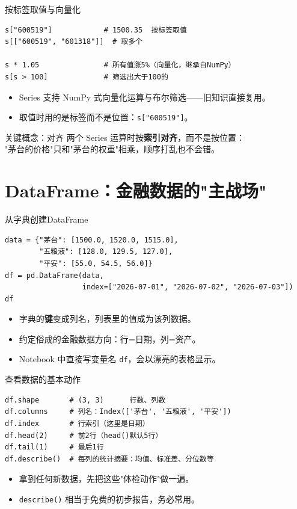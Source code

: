 \documentclass[9pt]{ctexbeamer}
\begin{document}
\begin{frame}[fragile]{按标签取值与向量化}
	\begin{lstlisting}
s["600519"]            # 1500.35  按标签取值
s[["600519", "601318"]]  # 取多个

s * 1.05               # 所有值涨5%（向量化，继承自NumPy）
s[s > 100]             # 筛选出大于100的
\end{lstlisting}
	\begin{itemize}
		\item Series 支持 NumPy 式向量化运算与布尔筛选——旧知识直接复用。
		\item 取值时用的是\alert{标签}而不是位置：\texttt{s["600519"]}。
	\end{itemize}
	\begin{alertblock}{关键概念：对齐}
		两个 Series 运算时按\textbf{索引对齐}，而不是按位置：\\
		"茅台的价格"只和"茅台的权重"相乘，顺序打乱也不会错。
	\end{alertblock}
\end{frame}


\section{DataFrame：金融数据的"主战场"}

\begin{frame}[fragile]{从字典创建DataFrame}
	\begin{lstlisting}
data = {"茅台": [1500.0, 1520.0, 1515.0],
        "五粮液": [128.0, 129.5, 127.0],
        "平安": [55.0, 54.5, 56.0]}
df = pd.DataFrame(data,
                  index=["2026-07-01", "2026-07-02", "2026-07-03"])
df
\end{lstlisting}
	\begin{itemize}
		\item 字典的\textbf{键}变成列名，列表里的值成为该列数据。
		\item 约定俗成的金融数据方向：\alert{行=日期，列=资产}。
		\item Notebook 中直接写变量名 \texttt{df}，会以漂亮的表格显示。
	\end{itemize}
\end{frame}

\begin{frame}[fragile]{查看数据的基本动作}
	\begin{lstlisting}
df.shape       # (3, 3)      行数、列数
df.columns     # 列名：Index(['茅台', '五粮液', '平安'])
df.index       # 行索引（这里是日期）
df.head(2)     # 前2行（head()默认5行）
df.tail(1)     # 最后1行
df.describe()  # 每列的统计摘要：均值、标准差、分位数等
\end{lstlisting}
	\begin{itemize}
		\item 拿到任何新数据，先把这些"体检动作"做一遍。
		\item \texttt{describe()} 相当于免费的初步报告，务必常用。
	\end{itemize}
\end{frame}
\end{document}
